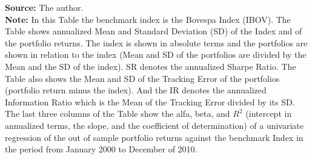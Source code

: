 \documentclass[12pt,oneside,a4paper]{memoir}
\begin{document}
\begin{table}[!ht]
\begin{threeparttable}
\begin{tablenotes} 
\textbf{Source:} The author. \\
\textbf{Note:} In this Table the benchmark index is the Bovespa Index (IBOV).
The Table shows annualized Mean and Standard Deviation (SD) of the Index and of the portfolio returns.
The index is shown in absolute terms and the portfolios are shown in relation to the index (Mean and SD of the portfolios are divided by the Mean and the SD of the index).
SR denotes the annualized Sharpe Ratio.
The Table also shows the Mean and SD of the Tracking Error of the portfolios (portfolio return minus the index).
And the IR denotes the annualized Information Ratio which is the Mean of the Tracking Error divided by its SD.
The last three columns of the Table show the alfa, beta, and $R^2$ (intercept in annualized terms, the slope, and the coefficient of determination) of a univariate regression of the out of sample portfolio returns against the benchmark Index in the period from January 2000 to December of 2010.
\end{tablenotes} 

\end{threeparttable}
\end{table} 

\clearpage
\end{document}
